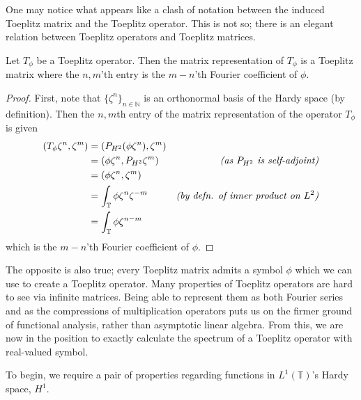 \documentclass[../main.tex]{subfiles}
\begin{document}
One may notice what appears like a clash of notation between the induced
Toeplitz matrix and the Toeplitz operator. This is not
so; there is an elegant relation between Toeplitz operators and Toeplitz
matrices.

\begin{theorem}
  Let $T_\phi$ be a Toeplitz operator. Then the matrix representation of $T_\phi$
  is a Toeplitz matrix where the $n,m$'th entry is the $m-n$'th Fourier coefficient
  of $\phi$.
\end{theorem}
\begin{proof}\cite{garcia2023operator}
First, note that $\{\zeta^n\}_{n\in\mathbb{N}}$ is an orthonormal basis of
the Hardy space (by definition).
Then the $n,m$th entry of the matrix representation of the operator $T_\phi$ is given
  \begin{align*}
    (T_{\phi}\zeta^n, \zeta^m) & = (P_{H^2}(\phi\zeta^n), \zeta^m) & \\
                               & = (\phi\zeta^n, P_{H^2}\zeta^m) 
                                 & \text{\emph{(as $P_{H^2}$ is self-adjoint)}} \\
                               & = (\phi\zeta^n, \zeta^m) &\\
                               & = \int_{\mathbb{T}} \phi\zeta^n \zeta^{-m}
                                 & \text{\emph{(by defn. of inner product on $L^2$)}}\\
                               & = \int_{\mathbb{T}} \phi \zeta^{n-m} &\\
  \end{align*}
which is the $m-n$'th Fourier coefficient of $\phi$.
\end{proof}
The opposite is also true; every Toeplitz matrix admits a symbol $\phi$ which
we can use to create a Toeplitz operator.\cite{garcia2023operator}
Many properties of Toeplitz operators are hard to see via infinite matrices.
Being able to represent them as both Fourier series and as the  compressions of
multiplication operators puts us on the firmer ground of functional analysis,
rather than asymptotic linear algebra. From this, we
are now in the position to exactly calculate the spectrum of a Toeplitz operator
with real-valued symbol.

To begin, we require a pair of properties regarding functions in
$L^1(\mathbb{T})$'s Hardy space, $H^1$. 
\end{document}
